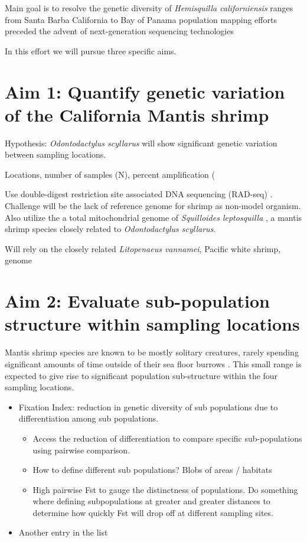 \documentclass[11pt]{article}
\begin{document}
Main goal is to resolve the genetic diversity of \emph{Hemisquilla californiensis} ranges from Santa Barba California to Bay of Panama 
population mapping efforts preceded the advent of next-generation sequencing technologies

In this effort we will pursue three specific aims. 


\section*{Aim 1: Quantify genetic variation of the California Mantis shrimp}
Hypothesis: \emph{Odontodactylus scyllarus} will show significant genetic variation between sampling locations.

Locations,   number   of   samples   (N),   percent amplification  (%



Use double-digest restriction site associated DNA sequencing (RAD-seq) \cite{Peterson2012}. Challenge will be the lack of reference genome for shrimp as non-model organism. Also utilize the a total mitochondrial genome of \emph{Squilloides leptosquilla} \cite{Kang2015}, a mantis shrimp species closely related to \emph{Odontodactylus scyllarus}. 

Will rely on the closely related \emph{Litopenaeus vannamei},  Pacific white shrimp, genome \cite{Zhang2019}


\section*{Aim 2: Evaluate sub-population structure within sampling locations}
Mantis shrimp species are known to be mostly solitary creatures, rarely spending significant amounts of time outside of their sea floor burrows \cite{Mead2010}. This small range is expected to give rise to significant population sub-structure within the four sampling locations. 


\begin{itemize}
	\item Fixation Index: reduction in genetic diversity of sub populations due to differentiation among sub populations.
	\begin{itemize}
		\item Access the reduction of differentiation to compare specific sub-populations using pairwise comparison. 
		\item How to define different sub populations? Blobs of areas / habitats
		\item High pairwise Fst to gauge the distinctness of populations. Do something where defining subpopulations 
		at greater and greater distances to determine how quickly Fst will drop off at different sampling sites. 
	\end{itemize}
	\item Another entry in the list
\end{itemize}
\end{document}
